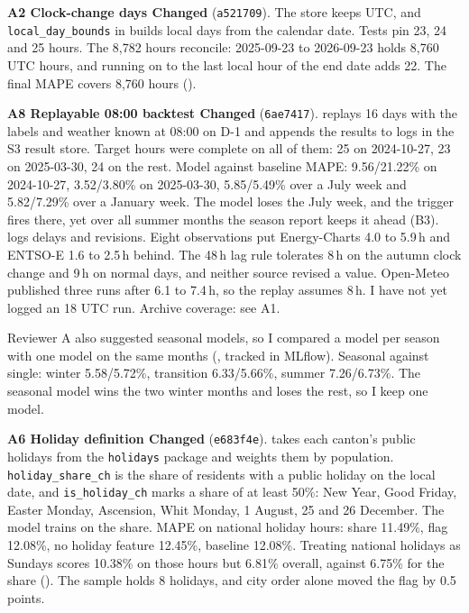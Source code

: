 \documentclass[10pt,a4paper]{article}
\newcommand{\point}[4]{\textbf{#1 \textperiodcentered{} #2 \textperiodcentered{} #3}\if\relax\detokenize{#4}\relax\else{} (\texttt{#4})\fi.}
\begin{document}
\point{A2}{Clock-change days}{Changed}{a521709}
The store keeps UTC, and \texttt{local\_day\_bounds} in  builds local days from the calendar
date. Tests pin 23, 24 and 25 hours. The 8,782 hours reconcile: 2025-09-23 to 2026-09-23 holds 8,760 UTC hours, and running on
to the last local hour of the end date adds 22. The final MAPE covers 8,760 hours ().

\point{A8}{Replayable 08:00 backtest}{Changed}{6ae7417}
 replays 16 days with the labels and weather known at 08:00 on D-1 and appends the results
to logs in the S3 result store. Target hours were complete on all of them: 25 on 2024-10-27, 23 on 2025-03-30, 24 on the rest.
Model against baseline MAPE: 9.56/21.22\% on 2024-10-27, 3.52/3.80\% on 2025-03-30, 5.85/5.49\% over a July week and
5.82/7.29\% over a January week. The model loses the July week, and the trigger fires there, yet over all summer months the
season report keeps it ahead (B3).  logs delays and revisions.
Eight observations put Energy-Charts 4.0 to 5.9\,h and ENTSO-E 1.6 to 2.5\,h behind. The 48\,h lag rule tolerates 8\,h on
the autumn clock change and 9\,h on normal days, and neither source revised a value. Open-Meteo published three runs after 6.1 to 7.4\,h, so the replay assumes
8\,h. I have not yet logged an 18 UTC run. Archive coverage: see A1.

Reviewer A also suggested seasonal models, so I compared
a model per season with one model on the same months (, tracked in MLflow).
Seasonal against single: winter 5.58/5.72\%, transition 6.33/5.66\%, summer 7.26/6.73\%. The seasonal model wins the two
winter months and loses the rest, so I keep one model.

\point{A6}{Holiday definition}{Changed}{e683f4e}
 takes each canton's public holidays from the \texttt{holidays} package and weights them by
population. \texttt{holiday\_share\_ch} is the share of residents with a public holiday on the local date, and
\texttt{is\_holiday\_ch} marks a share of at least 50\%: New Year, Good Friday, Easter Monday, Ascension, Whit Monday, 1 August,
25 and 26 December. The model trains on the share. MAPE on national holiday hours: share 11.49\%, flag 12.08\%, no holiday feature
12.45\%, baseline 12.08\%. Treating national holidays as Sundays scores 10.38\% on those hours but 6.81\% overall, against
6.75\% for the share (). The sample holds 8 holidays, and city order alone moved the
flag by 0.5 points.
\end{document}
